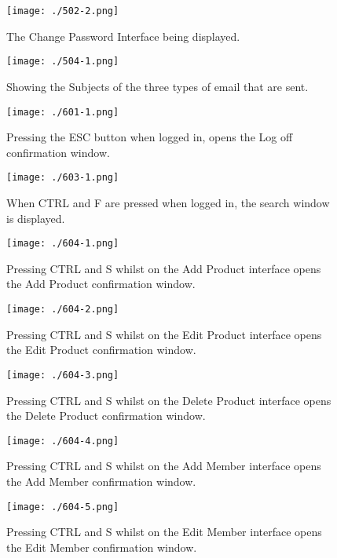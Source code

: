 \begin{figure}[H]
    \texttt{[image: ./502-2.png]}
    \caption{The Change Password Interface being displayed.} \label{fig:502-2}
\end{figure}

\begin{figure}[H]
    \texttt{[image: ./504-1.png]}
    \caption{Showing the Subjects of the three types of email that are sent.} \label{fig:504-1}
\end{figure}

\begin{figure}[H]
    \texttt{[image: ./601-1.png]}
    \caption{Pressing the ESC button when logged in, opens the Log off confirmation window.} \label{fig:601-1}
\end{figure}

\begin{figure}[H]
    \texttt{[image: ./603-1.png]}
    \caption{When CTRL and F are pressed when logged in, the search window is displayed.} \label{fig:603-1}
\end{figure}

\begin{figure}[H]
    \texttt{[image: ./604-1.png]}
    \caption{Pressing CTRL and S whilst on the Add Product interface opens the Add Product confirmation window.} \label{fig:604-1}
\end{figure}

\begin{figure}[H]
    \texttt{[image: ./604-2.png]}
    \caption{Pressing CTRL and S whilst on the Edit Product interface opens the Edit Product confirmation window.} \label{fig:604-2}
\end{figure}

\begin{figure}[H]
    \texttt{[image: ./604-3.png]}
    \caption{Pressing CTRL and S whilst on the Delete Product interface opens the Delete Product confirmation window.} \label{fig:604-3}
\end{figure}

\begin{figure}[H]
    \texttt{[image: ./604-4.png]}
    \caption{Pressing CTRL and S whilst on the Add Member interface opens the Add Member confirmation window.} \label{fig:604-4}
\end{figure}

\begin{figure}[H]
    \texttt{[image: ./604-5.png]}
    \caption{Pressing CTRL and S whilst on the Edit Member interface opens the Edit Member confirmation window.} \label{fig:604-5}
\end{figure}

